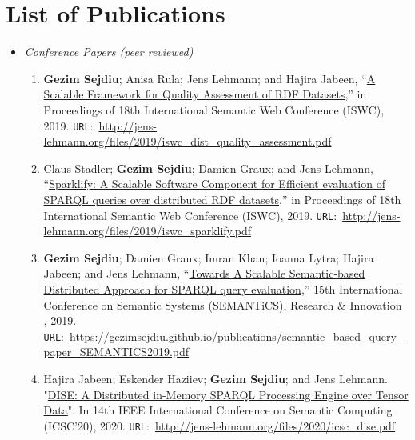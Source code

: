 \chapter{List of Publications}
\label{sec:appendix-publications}
\begin{itemize}
    
\item \emph{Conference Papers (peer reviewed)}

\begin{enumerate}

    \item \textbf{Gezim Sejdiu}; Anisa Rula; Jens Lehmann; and Hajira Jabeen, “\href{http://jens-lehmann.org/files/2019/iswc_dist_quality_assessment.pdf}{A Scalable Framework for Quality Assessment of RDF Datasets},” in Proceedings of 18th International Semantic Web Conference (ISWC), 2019. \texttt{URL}:~\url{http://jens-lehmann.org/files/2019/iswc_dist_quality_assessment.pdf}

    \item Claus Stadler; \textbf{Gezim Sejdiu}; Damien Graux; and Jens Lehmann, “\href{http://jens-lehmann.org/files/2019/iswc_sparklify.pdf}{Sparklify: A Scalable Software Component for Efficient evaluation of SPARQL queries over distributed RDF datasets},” in Proceedings of 18th International Semantic Web Conference (ISWC), 2019. \texttt{URL}:~\url{http://jens-lehmann.org/files/2019/iswc_sparklify.pdf}

    \item \textbf{Gezim Sejdiu}; Damien Graux; Imran Khan; Ioanna Lytra; Hajira Jabeen; and Jens Lehmann, “\href{https://gezimsejdiu.github.io/publications/semantic_based_query_paper_SEMANTICS2019.pdf}{Towards A Scalable Semantic-based Distributed Approach for SPARQL query evaluation},” 15th International Conference on Semantic Systems (SEMANTiCS), Research \& Innovation , 2019. \texttt{URL}:~\url{https://gezimsejdiu.github.io/publications/semantic_based_query_paper_SEMANTICS2019.pdf}
    
    \item Hajira Jabeen; Eskender Haziiev; \textbf{Gezim Sejdiu}; and Jens Lehmann. "\href{http://jens-lehmann.org/files/2020/icsc_dise.pdf}{DISE: A Distributed in-Memory SPARQL Processing Engine over Tensor Data}". In 14th IEEE International Conference on Semantic Computing (ICSC'20), 2020.
    \texttt{URL}:~\url{http://jens-lehmann.org/files/2020/icsc_dise.pdf}
    

\end{enumerate}
\end{itemize}
